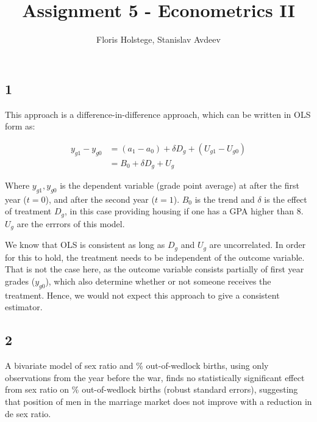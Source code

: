 \documentclass[
]{article}
\title{Assignment 5 - Econometrics II}
\author{Floris Holstege, Stanislav Avdeev}
\date{}
\begin{document}
\maketitle

\hypertarget{section}{%
\subsection{1}\label{section}}

This approach is a difference-in-difference approach, which can be
written in OLS form as:

\begin{align*}
  y_{g1} - y_{g0} &= (a_1 - a_0) + \delta D_g + (U_{g1} - U_{g0}) \\
                  &= B_0 + \delta D_g + U_g
\end{align*}

Where \(y_{g1}, y_{g0}\) is the dependent variable (grade point average)
at after the first year (\(t = 0\)), and after the second year
(\(t = 1\)). \(B_0\) is the trend and \(\delta\) is the effect of
treatment \(D_g\), in this case providing housing if one has a GPA
higher than 8. \(U_g\) are the errrors of this model.

We know that OLS is consistent as long as \(D_g\) and \(U_g\) are
uncorrelated. In order for this to hold, the treatment needs to be
independent of the outcome variable. That is not the case here, as the
outcome variable consists partially of first year grades (\(y_{g0}\)),
which also determine whether or not someone receives the treatment.
Hence, we would not expect this approach to give a consistent estimator.

\hypertarget{section-1}{%
\subsection{2}\label{section-1}}

A bivariate model of sex ratio and \% out-of-wedlock births, using only
observations from the year before the war, finds no statistically
significant effect from sex ratio on \% out-of-wedlock births (robust
standard errors), suggesting that position of men in the marriage market
does not improve with a reduction in de sex ratio.
\end{document}
